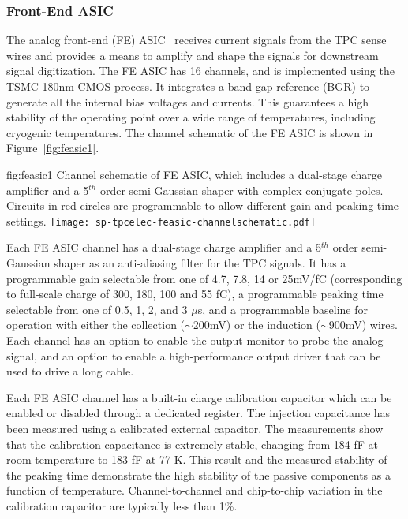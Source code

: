 \subsubsection{Front-End ASIC}
\label{sec:fdsp-tpcelec-design-femb-fe}

The analog front-end (FE) ASIC~\cite{DeGeronimo:2011zz} receives current signals from the TPC sense wires and provides a means to amplify and shape the signals for downstream signal digitization.  The FE ASIC has 16 channels, and is implemented using the TSMC 180nm CMOS process. It integrates a band-gap reference (BGR) to generate all the internal bias voltages and currents. This guarantees a high stability of the operating point over a wide range of temperatures, including cryogenic temperatures. The channel schematic of the FE ASIC is shown in Figure~\ref{fig:feasic1}. 

\begin{dunefigure}
{fig:feasic1}
{Channel schematic of FE ASIC, which includes a dual-stage charge amplifier and a 5$^{th}$ order semi-Gaussian shaper with complex conjugate poles. Circuits in red circles are programmable to allow different gain and peaking time settings.}
\texttt{[image: sp-tpcelec-feasic-channelschematic.pdf]}
\end{dunefigure}

Each FE ASIC channel has a dual-stage charge amplifier and a 5$^{th}$ order semi-Gaussian shaper as an anti-aliasing filter for the TPC signals. It has a programmable gain selectable from one of 4.7, 7.8, 14 or 25mV/fC (corresponding to full-scale charge of 300, 180, 100 and 55 fC), a programmable peaking time selectable from one of 0.5, 1, 2, and 3 $\mu$s, and a programmable baseline for operation with either the collection ($\sim$200mV) or the induction ($\sim$900mV) wires. Each channel has an option to enable the output monitor to probe the analog signal, and an option to enable a high-performance output driver that can be used to drive a long cable. 

Each FE ASIC channel has a built-in charge calibration capacitor which can be enabled or disabled through a dedicated register. The injection capacitance has been measured using a calibrated external capacitor. The measurements show that the calibration capacitance is extremely stable, changing from 184 fF at room temperature to 183 fF at 77 K. This result and the measured stability of the peaking time demonstrate the high stability of the passive components as a function of temperature. Channel-to-channel and chip-to-chip variation in the calibration capacitor are typically less than 1\%.


